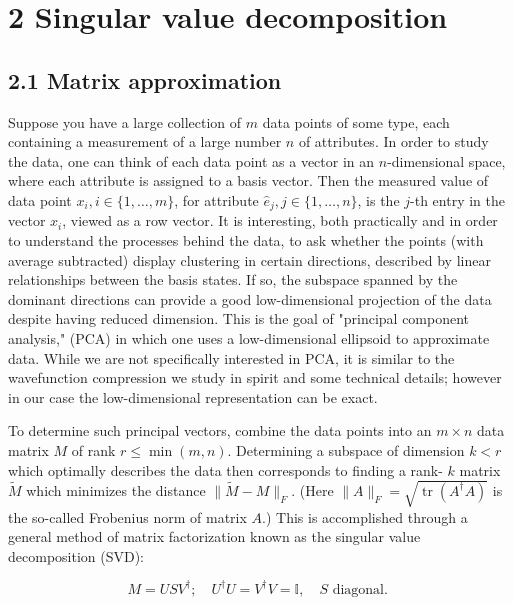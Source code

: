 \documentclass[12pt]{article}
\begin{document}
\section*{2 Singular value decomposition}
\subsection*{2.1 Matrix approximation}
Suppose you have a large collection of $m$ data points of some type, each containing a measurement of a large number $n$ of attributes. In order to study the data, one can think of each data point as a vector in an $n$-dimensional space, where each attribute is assigned to a basis vector. Then the measured value of data point $x_{i}, i \in\{1, \ldots, m\}$, for attribute $\hat{e}_{j}, j \in\{1, \ldots, n\}$, is the $j$-th entry in the vector $x_{i}$, viewed as a row vector. It is interesting, both practically and in order to understand the processes behind the data, to ask whether the points (with average subtracted) display clustering in certain directions, described by linear relationships between the basis states. If so, the subspace spanned by the dominant directions can provide a good low-dimensional projection of the data despite having reduced dimension. This is the goal of "principal component analysis," (PCA) in which one uses a low-dimensional ellipsoid to approximate data. While we are not specifically interested in PCA, it is similar to the wavefunction compression we study in spirit and some technical details; however in our case the low-dimensional representation can be exact.

To determine such principal vectors, combine the data points into an $m \times n$ data matrix $M$ of rank $r \leq \min (m, n)$. Determining a subspace of dimension $k<r$ which optimally describes the data then corresponds to finding a rank- $k$ matrix $\tilde{M}$ which minimizes the distance $\|\tilde{M}-M\|_{F}$. (Here $\|A\|_{F}=\sqrt{\operatorname{tr}\left(A^{\dagger} A\right)}$ is the so-called Frobenius norm of matrix $A$.) This is accomplished through a general method of matrix factorization known as the singular value decomposition (SVD):


\begin{equation*}
M=U S V^{\dagger} ; \quad U^{\dagger} U=V^{\dagger} V=\mathbb{I}, \quad S \text { diagonal. } \tag{1}
\end{equation*}
\end{document}
